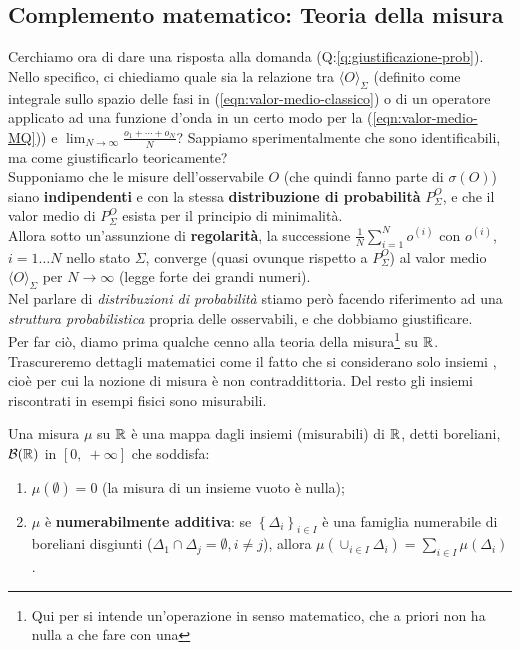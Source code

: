 \documentclass[FisicaTeorica.tex]{subfiles}
\begin{document}
\subsection{Complemento matematico: Teoria della misura}
Cerchiamo ora di dare una risposta alla domanda (Q:\ref{q:giustificazione-prob}). Nello specifico, ci chiediamo quale sia la relazione tra $\langle O \rangle_\Sigma$ (definito come integrale sullo spazio delle fasi in \textit{\MC} (\ref{eqn:valor-medio-classico}) o di un operatore applicato ad una funzione d'onda in un certo modo per la \textit{\MQ} (\ref{eqn:valor-medio-MQ})) e $\lim_{N\to\infty} \frac{o_1 + \cdots + o_N}{N}$? Sappiamo sperimentalmente che sono identificabili, ma come giustificarlo teoricamente?\\
Supponiamo che le misure dell'osservabile $O$ (che quindi fanno parte di $\sigma(O)$) siano \textbf{indipendenti} e con la stessa \textbf{distribuzione di probabilità} $P_\Sigma^O$, e che il valor medio di $P^O_\Sigma$ esista per il principio di minimalità.\\
Allora sotto un'assunzione di \textbf{regolarità}, la successione $\frac{1}{N}\sum_{i=1}^{N}o^{\left(i\right)}$ con $o^{(i)}$, $i=1\dots N$ nello stato $\Sigma$, converge (quasi ovunque rispetto a $P_\Sigma^O$) al valor medio $\langle O \rangle_\Sigma$  per $N\to\infty$ (legge forte dei grandi numeri).\\
Nel parlare di \textit{distribuzioni di probabilità} stiamo però facendo riferimento ad una \textit{struttura probabilistica} propria delle osservabili, e che dobbiamo giustificare.\\
Per far ciò, diamo prima qualche cenno alla teoria della misura\footnote{Qui per  si intende un'operazione in senso matematico, che a priori non ha nulla a che fare con una } su $\mathbb{R}$.\\
Trascureremo dettagli matematici come il fatto che si considerano solo insiemi , cioè per cui la nozione di misura è non contraddittoria. Del resto  gli insiemi riscontrati in esempi fisici sono misurabili.\\
\begin{dfn}
Una misura $\mu$ su $\mathbb{R}$ è una mappa dagli insiemi (misurabili) di $\mathbb{R}$, detti boreliani, $\mathcal{B}(\mathbb{R})$ in $\left[0,\ +\infty\right]$ che soddisfa:
\begin{enumerate}
    \item $\mu \left(\emptyset\right)=0$ (la misura di un insieme vuoto è nulla);
    \item $\mu$ è \textbf{numerabilmente additiva}: se $\left\{\Delta_i\right\}_{i\in I}$ è una famiglia numerabile di boreliani disgiunti ($\Delta_1 \cap \Delta_j=\emptyset, i\neq j$), allora $\mu\left(\cup_{i\in I}\Delta_i\right)= \sum_{i\in I}\mu\left(\Delta_i\right)$.
\end{enumerate}
\end{dfn}
\end{document}
